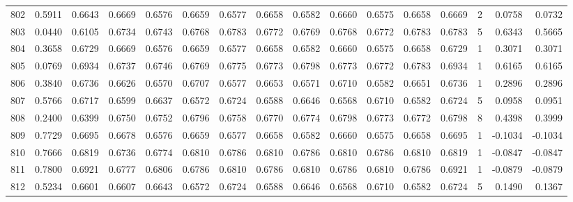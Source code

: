 \begin{tabular}{lrrrrrrrrrrrrrrr}
802 &      0.5911 &  0.6643 &  0.6669 &  0.6576 &  0.6659 &  0.6577 &  0.6658 &  0.6582 &  0.6660 &  0.6575 &   0.6658 &     0.6669 &      2 &                    0.0758 &                     0.0732 \\
803 &      0.0440 &  0.6105 &  0.6734 &  0.6743 &  0.6768 &  0.6783 &  0.6772 &  0.6769 &  0.6768 &  0.6772 &   0.6783 &     0.6783 &      5 &                    0.6343 &                     0.5665 \\
804 &      0.3658 &  0.6729 &  0.6669 &  0.6576 &  0.6659 &  0.6577 &  0.6658 &  0.6582 &  0.6660 &  0.6575 &   0.6658 &     0.6729 &      1 &                    0.3071 &                     0.3071 \\
805 &      0.0769 &  0.6934 &  0.6737 &  0.6746 &  0.6769 &  0.6775 &  0.6773 &  0.6798 &  0.6773 &  0.6772 &   0.6783 &     0.6934 &      1 &                    0.6165 &                     0.6165 \\
806 &      0.3840 &  0.6736 &  0.6626 &  0.6570 &  0.6707 &  0.6577 &  0.6653 &  0.6571 &  0.6710 &  0.6582 &   0.6651 &     0.6736 &      1 &                    0.2896 &                     0.2896 \\
807 &      0.5766 &  0.6717 &  0.6599 &  0.6637 &  0.6572 &  0.6724 &  0.6588 &  0.6646 &  0.6568 &  0.6710 &   0.6582 &     0.6724 &      5 &                    0.0958 &                     0.0951 \\
808 &      0.2400 &  0.6399 &  0.6750 &  0.6752 &  0.6796 &  0.6758 &  0.6770 &  0.6774 &  0.6798 &  0.6773 &   0.6772 &     0.6798 &      8 &                    0.4398 &                     0.3999 \\
809 &      0.7729 &  0.6695 &  0.6678 &  0.6576 &  0.6659 &  0.6577 &  0.6658 &  0.6582 &  0.6660 &  0.6575 &   0.6658 &     0.6695 &      1 &                   -0.1034 &                    -0.1034 \\
810 &      0.7666 &  0.6819 &  0.6736 &  0.6774 &  0.6810 &  0.6786 &  0.6810 &  0.6786 &  0.6810 &  0.6786 &   0.6810 &     0.6819 &      1 &                   -0.0847 &                    -0.0847 \\
811 &      0.7800 &  0.6921 &  0.6777 &  0.6806 &  0.6786 &  0.6810 &  0.6786 &  0.6810 &  0.6786 &  0.6810 &   0.6786 &     0.6921 &      1 &                   -0.0879 &                    -0.0879 \\
812 &      0.5234 &  0.6601 &  0.6607 &  0.6643 &  0.6572 &  0.6724 &  0.6588 &  0.6646 &  0.6568 &  0.6710 &   0.6582 &     0.6724 &      5 &                    0.1490 &                     0.1367 \\

\end{tabular}
